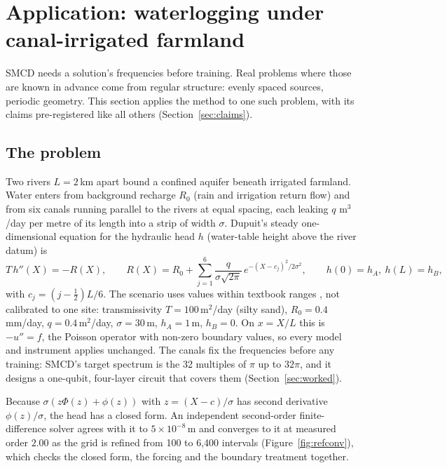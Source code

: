 \section{Application: waterlogging under canal-irrigated farmland}
\label{sec:groundwater}

SMCD needs a solution's frequencies before training. Real problems where those are known
in advance come from regular structure: evenly spaced sources, periodic geometry. This
section applies the method to one such problem, with its claims pre-registered like all
others (Section~\ref{sec:claims}).

\subsection{The problem}
Two rivers $L=2$\,km apart bound a confined aquifer beneath irrigated farmland. Water
enters from background recharge $R_0$ (rain and irrigation return flow) and from six
canals running parallel to the rivers at equal spacing, each leaking $q$ m$^3$/day per
metre of its length into a strip of width $\sigma$. Dupuit's steady one-dimensional
equation for the hydraulic head $h$ (water-table height above the river datum) is
\begin{equation}
  T\,h''(X) = -R(X),\qquad
  R(X) = R_0 + \sum_{j=1}^{6}\frac{q}{\sigma\sqrt{2\pi}}\,e^{-(X-c_j)^2/2\sigma^2},
  \qquad h(0)=h_A,\ h(L)=h_B,
\end{equation}
with $c_j=(j-\tfrac12)L/6$. The scenario uses values within textbook ranges
\citep{freeze1979groundwater,todd2005groundwater}, not calibrated to one site:
transmissivity $T=100$\,m$^2$/day (silty sand), $R_0=0.4$\,mm/day, $q=0.4$\,m$^2$/day,
$\sigma=30$\,m, $h_A=1$\,m, $h_B=0$. On $x=X/L$ this is $-u''=f$, the Poisson operator
with non-zero boundary values, so every model and instrument applies unchanged. The
canals fix the frequencies before any training: SMCD's target spectrum is the 32
multiples of $\pi$ up to $32\pi$, and it designs a one-qubit, four-layer circuit that
covers them (Section~\ref{sec:worked}).

Because $\sigma(z\Phi(z)+\phi(z))$ with $z=(X-c)/\sigma$ has second derivative
$\phi(z)/\sigma$, the head has a closed form. An independent second-order
finite-difference solver agrees with it to $5\times10^{-8}$\,m and converges to it at
measured order $2.00$ as the grid is refined from 100 to 6{,}400 intervals
(Figure~\ref{fig:refconv}), which checks the closed form, the forcing and the boundary
treatment together.

